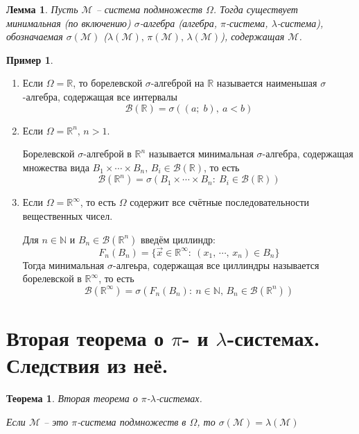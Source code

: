 \documentclass[a4paper,12pt]{article}
\theoremstyle{plain}
\newtheorem{theorem}{Теорема}[section]
\newtheorem{lemma}{Лемма}[section]
\theoremstyle{definition}
\newtheorem*{example}{Пример}
\theoremstyle{remark}
\begin{document}
\begin{lemma}
	Пусть $\mathcal{M}$ -- система подмножеств $\Omega$. Тогда существует минимальная (по включению) $\sigma$-алгебра (алгебра, $\pi$-система, $\lambda$-система), обозначаемая $\sigma(\mathcal{M})$ ($\lambda(\mathcal{M}),\, \pi(\mathcal{M}),\, \lambda(\mathcal{M})$), содержащая $\mathcal{M}$.
\end{lemma}

\begin{example}
	\begin{enumerate}
		\item Если $\Omega = \mathbb{R}$, то борелевской $\sigma$-алгеброй на $\mathbb{R}$ называется наименьшая $\sigma$-алгебра, содержащая все интервалы
		      \[\mathcal{B}(\mathbb{R}) = \sigma((a;\;b) ,\: a < b)\]
		\item Если $\Omega = \mathbb{R}^n,\, n > 1$.

		      Борелевской $\sigma$-алгеброй в $\mathbb{R}^n$ называется минимальная $\sigma$-алгебра, содержащая множества вида $B_1 \times \cdots \times B_n,\, B_i \in \mathcal{B}(\mathbb{R})$, то есть
		      \[\mathcal{B}(\mathbb{R}^n) = \sigma(B_1 \times \cdots \times B_n:\: B_i \in \mathcal{B}(\mathbb{R}))\]
		\item Если $\Omega = \mathbb{R}^\infty$, то есть $\Omega$ содержит все счётные последовательности вещественных чисел.

		      Для $n \in \mathbb{N}$ и $B_n \in \mathcal{B}(\mathbb{R}^n)$ введём циллиндр:
		      \[F_n(B_n) = \{\vec{x} \in \mathbb{R}^\infty :\: (x_1,\,\cdots,\,x_n) \in B_n\}\]
		      Тогда минимальная $\sigma$-алгеьра, содержащая все циллиндры называется борелевской в $\mathbb{R}^\infty$, то есть
		      \[\mathcal{B}(\mathbb{R}^\infty) = \sigma(F_n(B_n):\: n \in \mathbb{N},\, B_n \in \mathcal{B}(\mathbb{R}^n))\]
	\end{enumerate}
\end{example}

\section{Вторая теорема о $\pi$- и $\lambda$-системах. Следствия из неё.}
\begin{theorem} \label{SECOND_SYSTEM_TH}
	Вторая теорема о $\pi$-$\lambda$-системах.

	Если $\mathcal{M}$ -- это $\pi$-система подмножеств в $\Omega$, то $\sigma(\mathcal{M}) = \lambda(\mathcal{M})$
\end{theorem}
\end{document}
